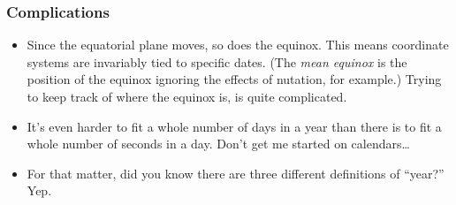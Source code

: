 \documentclass{beamer}
\begin{document}
\begin{frame}
  \frametitle{Complications}

  \begin{itemize}
  \item Since the equatorial plane moves, so does the equinox. This means
    coordinate systems are invariably tied to specific dates. (The \emph{mean
      equinox} is the position of the equinox ignoring the effects of nutation,
    for example.) Trying to keep track of where the equinox is, is quite
    complicated.
  \item It's even harder to fit a whole number of days in a year than there is
    to fit a whole number of seconds in a day. Don't get me started on
    calendars\ldots
  \item For that matter, did you know there are three different definitions of
    ``year?'' Yep.
  \end{itemize}
\end{frame}
\end{document}

